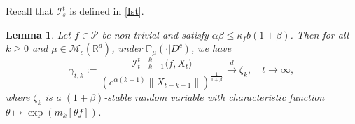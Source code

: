 \documentclass[12pt,a4paper]{amsart}
\theoremstyle{plain}
\newtheorem{lem}[thm]{Lemma}
\theoremstyle{definition}
\numberwithin{equation}{section}
\begin{document}
Recall that $\mathcal I_s^t$ is defined in \eqref{Ist}.
\begin{lem}
  \label{lem: mainlemma}
  Let $f\in \mathcal{P}$ be non-trivial and satisfy $\alpha\beta\leq \kappa_fb(1+\beta)$.
  Then for all $k\geq 0$ and $\mu \in \mathcal M_c(\mathbb R^d)$, under $\mathbb{P}_{\mu}(\cdot | D ^c)$, we have
\begin{equation}
    \gamma_{t,k}
    := \frac{\mathcal I_{t-k-1}^{t-k}\langle f ,X_t\rangle}{(e^{\alpha (k+1)}\|X_{t-k-1}\|)^{\frac{1}{1+\beta}}}\xrightarrow{d}\zeta_k, \quad t\rightarrow \infty, \label{limitdistribution1}
\end{equation}
where $\zeta_k$ is a $(1+\beta)$-stable random variable with characteristic function
$\theta\mapsto \exp(m_k[\theta f])$.
\end{lem}
\end{document}
